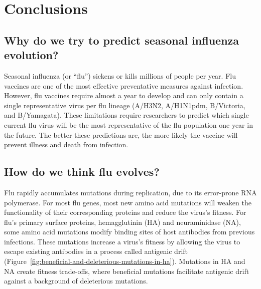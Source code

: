 \chapter{Conclusions}

\section{Why do we try to predict seasonal influenza evolution?}

Seasonal influenza (or ``flu'') sickens or kills millions of people per year.
Flu vaccines are one of the most effective preventative measures against infection.
However, flu vaccines require almost a year to develop and can only contain a single representative virus per flu lineage (A/H3N2, A/H1N1pdm, B/Victoria, and B/Yamagata).
These limitations require researchers to predict which single current flu virus will be the most representative of the flu population one year in the future.
The better these predictions are, the more likely the vaccine will prevent illness and death from infection.

\section{How do we think flu evolves?}

Flu rapidly accumulates mutations during replication, due to its error-prone RNA polymerase.
For most flu genes, most new amino acid mutations will weaken the functionality of their corresponding proteins and reduce the virus's fitness.
For flu's primary surface proteins, hemagglutinin (HA) and neuraminidase (NA), some amino acid mutations modify binding sites of host antibodies from previous infections.
These mutations increase a virus's fitness by allowing the virus to escape existing antibodies in a process called antigenic drift (Figure~\ref{fig:beneficial-and-deleterious-mutations-in-ha}).
Mutations in HA and NA create fitness trade-offs, where beneficial mutations facilitate antigenic drift against a background of deleterious mutations.

